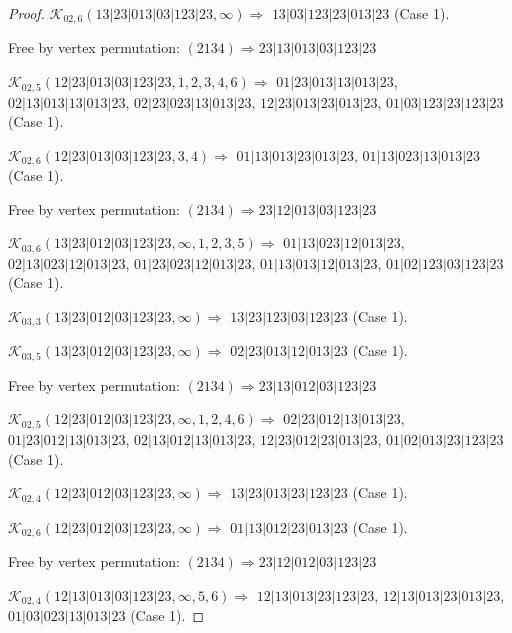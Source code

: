 \documentclass[12pt]{article}
\theoremstyle{plain}
\theoremstyle{definition}
\theoremstyle{remark}
\newcommand{\fancy}[1]{\mathcal{#1}}
\def\K{\fancy{K}}
\begin{document}
\begin{proof}
	$\K_{02,6}(13|23|013|03|123|23,\infty)\Rightarrow $ $13|03|123|23|013|23$ (Case 1).
	
	
	
	Free by vertex permutation: $(2 1 3 4)\Rightarrow 23|13|013|03|123|23$
	
	
	
	\bigskip
	
	$\K_{02,5}(12|23|013|03|123|23,1, 2, 3, 4, 6)\Rightarrow $ $01|23|013|13|013|23$, $02|13|013|13|013|23$, $02|23|023|13|013|23$, $12|23|013|23|013|23$, $01|03|123|23|123|23$ (Case 1).
	
	$\K_{02,6}(12|23|013|03|123|23,3, 4)\Rightarrow $ $01|13|013|23|013|23$, $01|13|023|13|013|23$ (Case 1).
	
	
	
	Free by vertex permutation: $(2 1 3 4)\Rightarrow 23|12|013|03|123|23$
	
	
	
	\bigskip
	
	$\K_{03,6}(13|23|012|03|123|23,\infty,1, 2, 3, 5)\Rightarrow $ $01|13|023|12|013|23$, $02|13|023|12|013|23$, $01|23|023|12|013|23$, $01|13|013|12|013|23$, $01|02|123|03|123|23$ (Case 1).
	
	$\K_{03,3}(13|23|012|03|123|23,\infty)\Rightarrow $ $13|23|123|03|123|23$ (Case 1).
	
	$\K_{03,5}(13|23|012|03|123|23,\infty)\Rightarrow $ $02|23|013|12|013|23$ (Case 1).
	
	
	
	Free by vertex permutation: $(2 1 3 4)\Rightarrow 23|13|012|03|123|23$
	
	
	
	\bigskip
	
	$\K_{02,5}(12|23|012|03|123|23,\infty,1, 2, 4, 6)\Rightarrow $ $02|23|012|13|013|23$, $01|23|012|13|013|23$, $02|13|012|13|013|23$, $12|23|012|23|013|23$, $01|02|013|23|123|23$ (Case 1).
	
	$\K_{02,4}(12|23|012|03|123|23,\infty)\Rightarrow $ $13|23|013|23|123|23$ (Case 1).
	
	$\K_{02,6}(12|23|012|03|123|23,\infty)\Rightarrow $ $01|13|012|23|013|23$ (Case 1).
	
	
	
	Free by vertex permutation: $(2 1 3 4)\Rightarrow 23|12|012|03|123|23$
	
	
	
	\bigskip
	
	$\K_{02,4}(12|13|013|03|123|23,\infty,5, 6)\Rightarrow $ $12|13|013|23|123|23$, $12|13|013|23|013|23$, $01|03|023|13|013|23$ (Case 1).
	

\end{proof}
\end{document}
